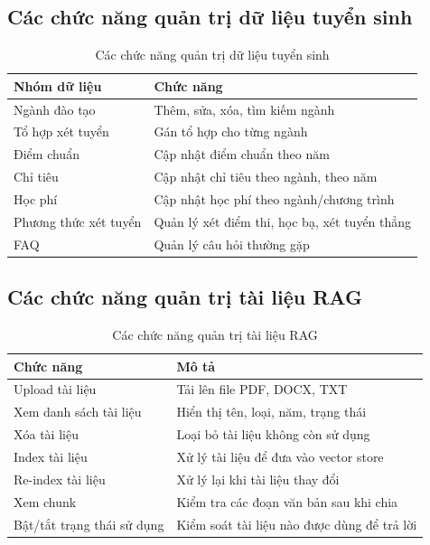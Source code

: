 \documentclass[12pt,a4paper]{report}
\begin{document}
\subsection{Các chức năng quản trị dữ liệu tuyển sinh}
\begin{table}[H]
\centering
\caption{Các chức năng quản trị dữ liệu tuyển sinh}
\label{tab:admin_data_functions}
\begin{tabular}{|p{4cm}|p{8cm}|}
\hline
\textbf{Nhóm dữ liệu} & \textbf{Chức năng} \\ \hline
Ngành đào tạo & Thêm, sửa, xóa, tìm kiếm ngành \\ \hline
Tổ hợp xét tuyển & Gán tổ hợp cho từng ngành \\ \hline
Điểm chuẩn & Cập nhật điểm chuẩn theo năm \\ \hline
Chỉ tiêu & Cập nhật chỉ tiêu theo ngành, theo năm \\ \hline
Học phí & Cập nhật học phí theo ngành/chương trình \\ \hline
Phương thức xét tuyển & Quản lý xét điểm thi, học bạ, xét tuyển thẳng \\ \hline
FAQ & Quản lý câu hỏi thường gặp \\ \hline
\end{tabular}
\end{table}

\subsection{Các chức năng quản trị tài liệu RAG}
\begin{table}[H]
\centering
\caption{Các chức năng quản trị tài liệu RAG}
\label{tab:admin_rag_functions}
\begin{tabular}{|p{4cm}|p{8cm}|}
\hline
\textbf{Chức năng} & \textbf{Mô tả} \\ \hline
Upload tài liệu & Tải lên file PDF, DOCX, TXT \\ \hline
Xem danh sách tài liệu & Hiển thị tên, loại, năm, trạng thái \\ \hline
Xóa tài liệu & Loại bỏ tài liệu không còn sử dụng \\ \hline
Index tài liệu & Xử lý tài liệu để đưa vào vector store \\ \hline
Re-index tài liệu & Xử lý lại khi tài liệu thay đổi \\ \hline
Xem chunk & Kiểm tra các đoạn văn bản sau khi chia \\ \hline
Bật/tắt trạng thái sử dụng & Kiểm soát tài liệu nào được dùng để trả lời \\ \hline
\end{tabular}
\end{table}
\end{document}
